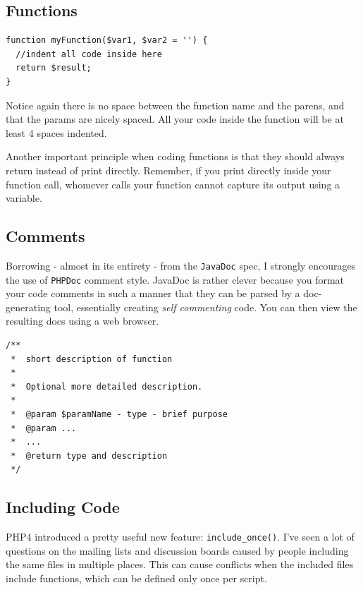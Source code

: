\documentclass[headexclude,footexclude,12pt,BCOR0pt,DIV15]{scrartcl}
\begin{document}
    \subsection{Functions}

\begin{lstlisting}[stepnumber=0,frame={}]
function myFunction($var1, $var2 = '') {
  //indent all code inside here
  return $result;
}
\end{lstlisting}

        Notice again there is no space between the function name and the parens, and that the params are nicely
        spaced. All your code inside the function will be at least 4 spaces indented.

        Another important principle when coding functions is that they should always return instead of print directly.
        Remember, if you print directly inside your function call, whomever calls your function cannot capture its
        output using a variable.

    \subsection{Comments}
        Borrowing - almost in its entirety - from the \texttt{JavaDoc} spec, I strongly encourages the use of \texttt{PHPDoc} comment style.
        JavaDoc is rather clever because you format your code comments in such a manner that they can be parsed by a
        doc-generating tool, essentially creating \emph{self commenting} code. You can then view the resulting docs using a web browser.

\begin{lstlisting}[stepnumber=0,frame={}]
/**
 *  short description of function
 *
 *  Optional more detailed description.
 *
 *  @param $paramName - type - brief purpose
 *  @param ...
 *  ...
 *  @return type and description
 */
\end{lstlisting}


    \subsection{Including Code}
        PHP4 introduced a pretty useful new feature: \texttt{include\_once()}. I've seen a lot of questions on the mailing
        lists and discussion boards caused by people including the same files in multiple places. This can cause conflicts
        when the included files include functions, which can be defined only once per script.
\end{document}
